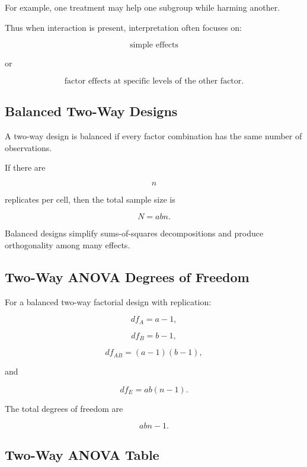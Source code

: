 For example, one treatment may help one subgroup while harming another.

Thus when interaction is present, interpretation often focuses on:

\[
\boxed{
\text{simple effects}
}
\]

or

\[
\boxed{
\text{factor effects at specific levels of the other factor}.
}
\]

\subsection{Balanced Two-Way Designs}
\label{subsec:balanced-two-way-anova}

A two-way design is balanced if every factor combination has the same
number of observations.

If there are

\[
n
\]

replicates per cell, then the total sample size is

\[
\boxed{
N=abn.
}
\]

Balanced designs simplify sums-of-squares decompositions and produce
orthogonality among many effects.

\subsection{Two-Way ANOVA Degrees of Freedom}
\label{subsec:two-way-anova-df}

For a balanced two-way factorial design with replication:

\[
\boxed{
df_A
=
a-1,
}
\]

\[
\boxed{
df_B
=
b-1,
}
\]

\[
\boxed{
df_{AB}
=
(a-1)(b-1),
}
\]

and

\[
\boxed{
df_E
=
ab(n-1).
}
\]

The total degrees of freedom are

\[
\boxed{
abn-1.
}
\]

\subsection{Two-Way ANOVA Table}
\label{subsec:two-way-anova-table}

